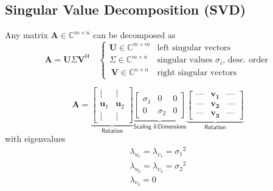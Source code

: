 
\subsection{Singular Value Decomposition (SVD)}

Any matrix $\mathbf{A}\in \mathbb{C}^{m\times n}$ can be decomposed as
\noindent\begin{equation*}
    \mathbf{A}=\mathbf{U}\Sigma \mathbf{V}^{\mathsf{H}}\quad \begin{cases}
        \mathbf{U}\in \mathbb{C}^{m\times m} & \text{left singular vectors}                          \\
        \Sigma\in \mathbb{C}^{m\times n}     & \text{singular values }\sigma_i \text{, desc.\ order} \\\
        \mathbf{V}\in \mathbb{C}^{n\times n} & \text{right singular vectors}\
    \end{cases}
\end{equation*}


\noindent\begin{equation*}
    \mathbf{A}=
    \underbrace{\begin{bmatrix}
            \vert        & \vert        \\
            \mathbf{u}_1 & \mathbf{u}_2 \\
            \vert        & \vert
        \end{bmatrix}}_{\textsf{Rotation}}
    \underbrace{\begin{bmatrix}
            \sigma_1 & 0        & 0 \\
            0        & \sigma_2 & 0
        \end{bmatrix}}_{\textsf{Scaling \& Dimensions}}
    \underbrace{\begin{bmatrix}
            \text{---} & \mathbf{v_1} & \text{---} \\
            \text{---} & \mathbf{v_2} & \text{---} \\
            \text{---} & \mathbf{v_3} & \text{---}
        \end{bmatrix}}_{\textsf{Rotation}}
\end{equation*}
with eigenvalues
\noindent\begin{gather*}
    \lambda_{u_1}=\lambda_{v_1}={\sigma_1}^2\\
    \lambda_{u_2}=\lambda_{v_2}={\sigma_2}^2\\
    \lambda_{v_3}=0
\end{gather*}


